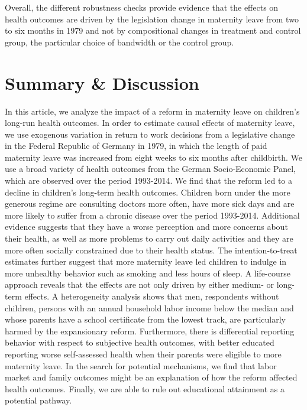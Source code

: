 \documentclass[a4paper ]{article}
\begin{document}
Overall, the different robustness checks provide evidence that the effects on health outcomes are driven by the legislation change in maternity leave from two to six months in 1979 and not by compositional changes in treatment and control group, the particular choice of bandwidth or the control group.



\bigskip%
\section{Summary \& Discussion}
\label{sec: Conclusion}


In this article, we analyze the impact of a reform in maternity leave on children's long-run health outcomes. In order to estimate causal effects of maternity leave, we use exogenous variation in return to work decisions from a legislative change in the Federal Republic of Germany in 1979, in which the length of paid maternity leave was increased from eight weeks to six months after childbirth. We use a broad variety of health outcomes from the German Socio-Economic Panel, which are observed over the period 1993-2014. We find that the reform led to a decline in children's long-term health outcomes. Children born under the more generous regime are consulting doctors more often, have more sick days and are more likely to suffer from a chronic disease over the period 1993-2014. Additional evidence suggests that they have a worse perception and more concerns about their health, as well as more problems to carry out daily activities and they are more often socially constrained due to their health status. The intention-to-treat estimates further suggest that more maternity leave led children to indulge in more unhealthy behavior such as smoking and less hours of sleep. A life-course approach reveals that the effects are not only driven by either medium- or long-term effects. A heterogeneity analysis shows that men, respondents without children, persons with an annual household labor income below the median and whose parents have a school certificate from the lowest track, are particularly harmed by the expansionary reform. Furthermore, there is differential reporting behavior with respect to subjective health outcomes, with better educated reporting worse self-assessed health when their parents were eligible to more maternity leave. In the search for potential mechanisms, we find that labor market and family outcomes might be an explanation of how the reform affected health outcomes. Finally, we are able to rule out educational attainment as a potential pathway.\newline
\end{document}

